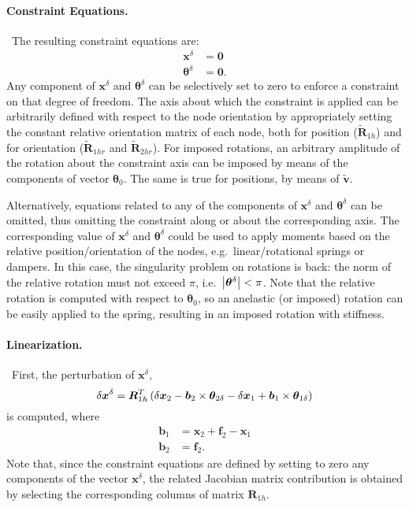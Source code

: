 \documentclass[10pt,fleqn,subeqn]{report}
\newcommand{\T}[1]{\bm{#1}}
\begin{document}
\paragraph{Constraint Equations.} \
The resulting constraint equations are:
\begin{subequations}
\begin{align}
	\T{x}^{\delta} &= \T{0}
	\label{TOTAL-JOINT:constraint-x} \\
	\T{\theta}^{\delta} &= \T{0} .
	\label{TOTAL-JOINT:constraint-theta}
\end{align}
\end{subequations}
Any component of $\T{x}^{\delta}$ and $\T{\theta}^{\delta}$
can be selectively set to zero to enforce a constraint
on that degree of freedom.
The axis about which the constraint is applied can be arbitrarily 
defined with respect to the node orientation
by appropriately setting the constant relative orientation
matrix of each node, both for position ($\tilde{\T{R}}_{1h}$) 
and for orientation ($\tilde{\T{R}}_{1hr}$ and $\tilde{\T{R}}_{2hr}$).
For imposed rotations, an arbitrary amplitude of the rotation about 
the constraint axis can be imposed by means of the components 
of vector $\T{\theta}_0$.
The same is true for positions, by means of $\tilde{\T{v}}$. 

Alternatively, equations related to any of the components
of $\T{x}^{\delta}$ and $\T{\theta}^{\delta}$ can be omitted,
thus omitting the constraint along or about the corresponding axis.
The corresponding value of  $\T{x}^{\delta}$ and $\T{\theta}^{\delta}$ 
could be used to apply moments based on the relative position/orientation 
of the nodes, e.g.\ linear/rotational springs or dampers.
In this case, the singularity problem on rotations is back: the norm
of the relative rotation must not exceed $\pi$, i.e.\
$\shbr{\T{\theta}^{\delta}}<\pi$.
Note that the relative rotation is computed with respect to 
$\T{\theta}_0$, so an anelastic (or imposed) rotation can be easily
applied to the spring, resulting in an imposed rotation with stiffness.

\paragraph{Linearization.} \
First, the perturbation of $\T{x}^{\delta}$,
\begin{equation}
	\delta \T{x}^{\delta} = 
	\T{R}_{1h}^T\plbr{
		\delta\T{x}_2 - \T{b}_2 \times \T{\theta}_{2\delta}
		- \delta\T{x}_1 + \T{b}_1 \times \T{\theta}_{1\delta}
	}
\end{equation}
is computed, where
\begin{subequations}
\begin{align}
	\T{b}_1 &= \T{x}_2 + \T{f}_2 - \T{x}_1 \\
	\T{b}_2 &= \T{f}_2 .
\end{align}
\end{subequations}
Note that, since the constraint equations are defined by setting 
to zero any components of the vector $\T{x}^{\delta}$, the
related Jacobian matrix contribution is obtained by selecting 
the corresponding columns of matrix $\T{R}_{1h}$.
\end{document}
